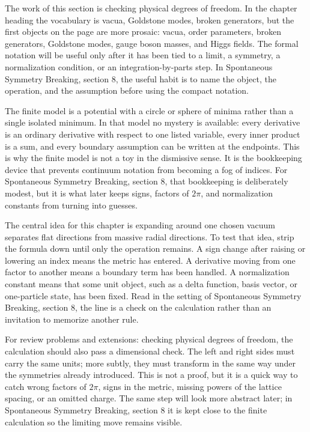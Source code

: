 The work of this section is checking physical degrees of freedom.  In the chapter heading the vocabulary is vacua, Goldstone modes, broken generators, but the first objects on the page are more prosaic: vacua, order parameters, broken generators, Goldstone modes, gauge boson masses, and Higgs fields.  The formal notation will be useful only after it has been tied to a limit, a symmetry, a normalization condition, or an integration-by-parts step.  In Spontaneous Symmetry Breaking, section 8, the useful habit is to name the object, the operation, and the assumption before using the compact notation.

The finite model is a potential with a circle or sphere of minima rather than a single isolated minimum.  In that model no mystery is available: every derivative is an ordinary derivative with respect to one listed variable, every inner product is a sum, and every boundary assumption can be written at the endpoints.  This is why the finite model is not a toy in the dismissive sense.  It is the bookkeeping device that prevents continuum notation from becoming a fog of indices.  For Spontaneous Symmetry Breaking, section 8, that bookkeeping is deliberately modest, but it is what later keeps signs, factors of \(2\pi\), and normalization constants from turning into guesses.

The central idea for this chapter is expanding around one chosen vacuum separates flat directions from massive radial directions.  To test that idea, strip the formula down until only the operation remains.  A sign change after raising or lowering an index means the metric has entered.  A derivative moving from one factor to another means a boundary term has been handled.  A normalization constant means that some unit object, such as a delta function, basis vector, or one-particle state, has been fixed.  Read in the setting of Spontaneous Symmetry Breaking, section 8, the line is a check on the calculation rather than an invitation to memorize another rule.

For review problems and extensions: checking physical degrees of freedom, the calculation should also pass a dimensional check.  The left and right sides must carry the same units; more subtly, they must transform in the same way under the symmetries already introduced.  This is not a proof, but it is a quick way to catch wrong factors of \(2\pi\), signs in the metric, missing powers of the lattice spacing, or an omitted charge.  The same step will look more abstract later; in Spontaneous Symmetry Breaking, section 8 it is kept close to the finite calculation so the limiting move remains visible.

